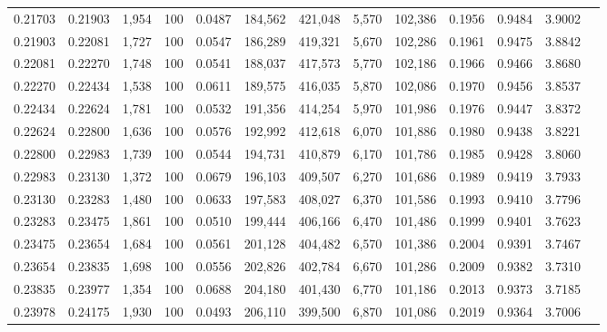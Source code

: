 \begin{tabular}{rrrrrrrrrrrrr}
0.21703 & 0.21903 & 1,954 & 100 &                                     0.0487 & 184,562 & 421,048 &   5,570 & 102,386 & 0.1956 & 0.9484 & 3.9002 \\
0.21903 & 0.22081 & 1,727 & 100 &                                     0.0547 & 186,289 & 419,321 &   5,670 & 102,286 & 0.1961 & 0.9475 & 3.8842 \\
0.22081 & 0.22270 & 1,748 & 100 &                                     0.0541 & 188,037 & 417,573 &   5,770 & 102,186 & 0.1966 & 0.9466 & 3.8680 \\
0.22270 & 0.22434 & 1,538 & 100 &                                     0.0611 & 189,575 & 416,035 &   5,870 & 102,086 & 0.1970 & 0.9456 & 3.8537 \\
0.22434 & 0.22624 & 1,781 & 100 &                                     0.0532 & 191,356 & 414,254 &   5,970 & 101,986 & 0.1976 & 0.9447 & 3.8372 \\
0.22624 & 0.22800 & 1,636 & 100 &                                     0.0576 & 192,992 & 412,618 &   6,070 & 101,886 & 0.1980 & 0.9438 & 3.8221 \\
0.22800 & 0.22983 & 1,739 & 100 &                                     0.0544 & 194,731 & 410,879 &   6,170 & 101,786 & 0.1985 & 0.9428 & 3.8060 \\
0.22983 & 0.23130 & 1,372 & 100 &                                     0.0679 & 196,103 & 409,507 &   6,270 & 101,686 & 0.1989 & 0.9419 & 3.7933 \\
0.23130 & 0.23283 & 1,480 & 100 &                                     0.0633 & 197,583 & 408,027 &   6,370 & 101,586 & 0.1993 & 0.9410 & 3.7796 \\
0.23283 & 0.23475 & 1,861 & 100 &                                     0.0510 & 199,444 & 406,166 &   6,470 & 101,486 & 0.1999 & 0.9401 & 3.7623 \\
0.23475 & 0.23654 & 1,684 & 100 &                                     0.0561 & 201,128 & 404,482 &   6,570 & 101,386 & 0.2004 & 0.9391 & 3.7467 \\
0.23654 & 0.23835 & 1,698 & 100 &                                     0.0556 & 202,826 & 402,784 &   6,670 & 101,286 & 0.2009 & 0.9382 & 3.7310 \\
0.23835 & 0.23977 & 1,354 & 100 &                                     0.0688 & 204,180 & 401,430 &   6,770 & 101,186 & 0.2013 & 0.9373 & 3.7185 \\
0.23978 & 0.24175 & 1,930 & 100 &                                     0.0493 & 206,110 & 399,500 &   6,870 & 101,086 & 0.2019 & 0.9364 & 3.7006 \\

\end{tabular}
